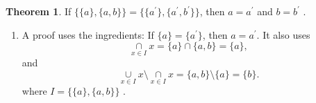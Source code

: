\documentclass[fleqn]{beamer}
\theoremstyle{definition}
\newtheorem{myth}{Theorem}
\newenvironment{checklist}{
  \begin{enumerate}[\ding{51}]
    \addtolength{\itemsep}{-0.0\itemsep}}
  {\end{enumerate}}
\begin{document}
\begin{frame}

\begin{myth}  If  \(  \{\{a\}, \{a,b\} \} =   \{\{a^\prime\}, \{a^\prime,b^\prime\} \}\), then \(a = a^\prime\) and  \(b = b^\prime\) .
\end{myth}

\begin{checklist}

\item A proof uses the ingredients:  If \( \{a \} = \{a^\prime \}\), then \(a = a^\prime\). It also uses
\[
   \underset{x \in I}{\cap} x =  \{a\} \cap \{a,b\} = \{a\},
\]
and
\[
    \underset{x \in I}{\cup} x   \setminus \underset{x \in I}{\cap} x  = \{a,b\} \setminus \{a\} = \{b\}.
\]
where \(I = \{\{a\}, \{a,b\}\} \) .

\end{checklist}
\end{frame}
\end{document}
